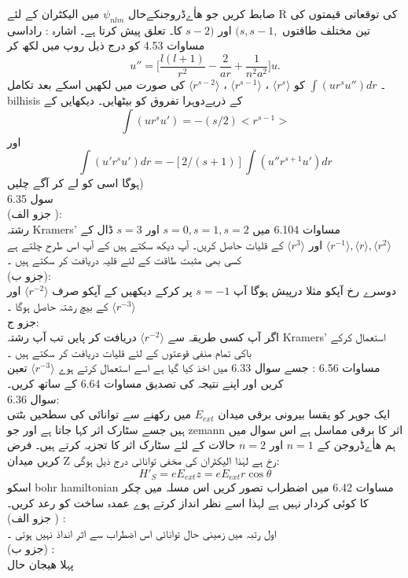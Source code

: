 \documentclass{book}
\begin{document}
صابط کریں جو ھاٰےڈروجنکےحال 
\(\psi_{nlm}\)
میں الیکٹران کے لئے R کی توقعاتی قیمتوں کی تین مختلف طاقتوں
\((s,s-1,\)
اور
\(s-2)\)
کا۔ تعلق پیش کرتا ہے۔ اشارہ : راداسی مساوات 4.53 کو درج ذیل روپ میں لکھ کر
\[u''=\big[\frac{l(l+1)}{r^{2}}-\frac{2}{ar}+\frac{1}{n^{2}a^{2}}\big]u.\]
۔
\(\int(ur^{s}u'')dr\)	 
کو 
\(\langle r^{s}\rangle\)
،
\(\langle r^{s-1}\rangle\)
،
\(\langle r^{s-2}\rangle \)
کی  صورت میں لکھیں اسکے بعد تکامل
bilhisis
کے ذریےدوہرا تفروق کو بیٹھایں۔ دیکھایں کے\\
\[\int(ur^{s}u')=-(s/2)<r^{s-1}>\]
اور
\[\int(u'r^{s}u')dr=-[2/(s+1)]\int(u''r^{s+1}u')dr\]
ہوگا اسی کو لے کر آگے چلیں)\\
سول 6.35\\ 
(جزو الف ):\\
 رشتہ Kramers' مساوات 6.104 میں
\(s=0,s=1,s=2\)
اور 
\(s=3\)
ڈال کے 
\(\langle r^{-1}\rangle,\langle r\rangle,\langle r^{2}\rangle\)
اور 
\(\langle r^{3}\rangle\)
کے قلیات حاصل کریں۔ آپ دیکھ سکتے ہیں کے آپ اس طرح چلتے ہے کسی بھی مثبت طاقت کے لئے قلیہ دریافت کر سکتے ہیں ۔\\
(جزو ب):\\ 
دوسرے رخ آپکو مثلا درپیش  ہوگا آپ 
\(s=-1\)
پر کرکے دیکھیں کے آپکو صرف 
\(\langle r^{-2}\rangle\)
اور 
\(\langle r^{-3}\rangle\)
کے بیچ رشتہ حاصل ہوگا ۔\\
جزو ج:\\
 اگر آپ کسی طریقہ سے
\(\langle r^{-2}\rangle\)
دریافت کر پایں تب آپ رشتہ Kramers' استعمال کرکے باکی تمام منفی قوعتوں کے لئے قلیات دریافت کر سکتے ہیں ۔\\
مساوات 6.56 : جسے سوال 6.33 میں اخذ کیا گیا ہے اسے استعمال کرتے ہوے 
\(\langle r^{-3}\rangle\)
تعین کریں اور اپنے نتیجہ کی تصدیق مساوات 6.64 کے ساتھ کریں۔\\
سوال 6.36: \\
ایک جوہر کو يقسا بیرونی برقی میدان
\(E_{ext}\)
میں رکھنے سے توانائی کی سطحیں بٹتی ہیں جسے سٹارک اثر کہا جاتا ہے اور جو zemann اثر کا برقی مماسل ہے اس سوال میں ہم ھاٰےڈروجن کے 
\(n=1\)
اور 
\(n=2\)
حالات کے لئے سٹارک اثر کا تجزیہ کرتے ہیں۔ فرض کریں میدان
Z
رخ ہے لہٰذا الیکٹران کی مخفی توانائی درج ذیل ہوگی: 
\[H'_{S}=eE_{ext}z=eE_{ext}r\cos{\theta}\]
اسکو bohr hamiltonian  مساوات 6.42 میں اضطراب تصور کریں اس مسلہ میں چکر کا کوئی کردار نہیں ہے لہذا اسے نظر انداز کرتے ہوے عمدہ ساخت کو رعد کریں۔\\
(جزو الف ) :\\
 اول رتبہ میں زمینی حال توانائی اس اضطراب سے اثر انداذ نہیں ہوتی ۔\\
(جزو ب) :\\  
پہلا هیجان حال
\end{document}
